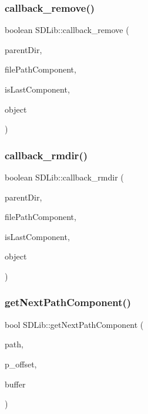 \mbox{\label{namespace_s_d_lib_a63cc4943fe20b320fa612b62d8f154bd}} 
\subsubsection{\texorpdfstring{callback\+\_\+remove()}{callback\_remove()}}
{\footnotesize\ttfamily boolean S\+D\+Lib\+::callback\+\_\+remove (\begin{DoxyParamCaption}\item[{\hyperlink{class_sd_file}{Sd\+File} \&}]{parent\+Dir,  }\item[{const char $\ast$}]{file\+Path\+Component,  }\item[{boolean}]{is\+Last\+Component,  }\item[{void $\ast$}]{object }\end{DoxyParamCaption})}

\mbox{\label{namespace_s_d_lib_ac81c649845a87cad2dcfd20f67f7c5aa}} 
\subsubsection{\texorpdfstring{callback\+\_\+rmdir()}{callback\_rmdir()}}
{\footnotesize\ttfamily boolean S\+D\+Lib\+::callback\+\_\+rmdir (\begin{DoxyParamCaption}\item[{\hyperlink{class_sd_file}{Sd\+File} \&}]{parent\+Dir,  }\item[{const char $\ast$}]{file\+Path\+Component,  }\item[{boolean}]{is\+Last\+Component,  }\item[{void $\ast$}]{object }\end{DoxyParamCaption})}

\mbox{\label{namespace_s_d_lib_a104e127390a656ec68fb11b782acb7c1}} 
\subsubsection{\texorpdfstring{get\+Next\+Path\+Component()}{getNextPathComponent()}}
{\footnotesize\ttfamily bool S\+D\+Lib\+::get\+Next\+Path\+Component (\begin{DoxyParamCaption}\item[{const char $\ast$}]{path,  }\item[{unsigned int $\ast$}]{p\+\_\+offset,  }\item[{char $\ast$}]{buffer }\end{DoxyParamCaption})}

